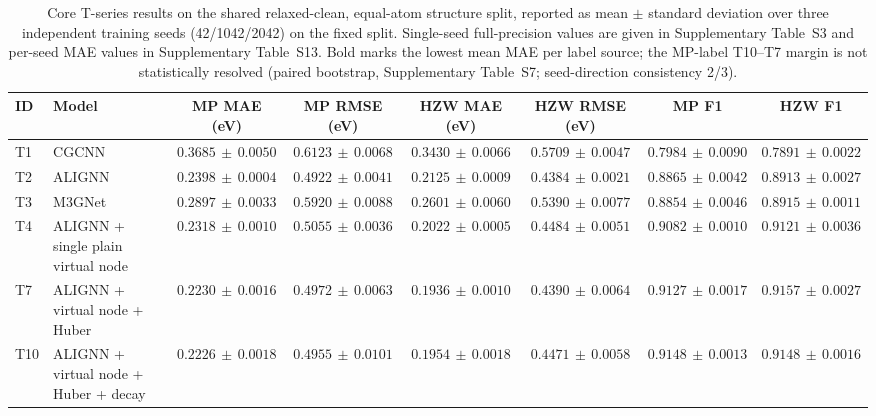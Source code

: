 \documentclass[a4paper,11pt]{article}
\begin{document}
\begin{table}[H]
\centering
\caption{Core T-series results on the shared relaxed-clean, equal-atom structure split, reported as mean \(\pm\) standard deviation over three independent training seeds (42/1042/2042) on the fixed split. Single-seed full-precision values are given in Supplementary Table~S3 and per-seed MAE values in Supplementary Table~S13. Bold marks the lowest mean MAE per label source; the MP-label T10--T7 margin is not statistically resolved (paired bootstrap, Supplementary Table~S7; seed-direction consistency 2/3).}
\label{tab:main-results}
\scriptsize
\setlength{\tabcolsep}{3.5pt}
\begin{tabularx}{\textwidth}{l Y c c c c c c}
\toprule
ID & Model & MP MAE (eV) & MP RMSE (eV) & HZW MAE (eV) & HZW RMSE (eV) & MP F1 & HZW F1 \\
\midrule
T1 & CGCNN & \(0.3685\,{\pm}\,0.0050\) & \(0.6123\,{\pm}\,0.0068\) & \(0.3430\,{\pm}\,0.0066\) & \(0.5709\,{\pm}\,0.0047\) & \(0.7984\,{\pm}\,0.0090\) & \(0.7891\,{\pm}\,0.0022\) \\
T2 & ALIGNN & \(0.2398\,{\pm}\,0.0004\) & \(0.4922\,{\pm}\,0.0041\) & \(0.2125\,{\pm}\,0.0009\) & \(0.4384\,{\pm}\,0.0021\) & \(0.8865\,{\pm}\,0.0042\) & \(0.8913\,{\pm}\,0.0027\) \\
T3 & M3GNet & \(0.2897\,{\pm}\,0.0033\) & \(0.5920\,{\pm}\,0.0088\) & \(0.2601\,{\pm}\,0.0060\) & \(0.5390\,{\pm}\,0.0077\) & \(0.8854\,{\pm}\,0.0046\) & \(0.8915\,{\pm}\,0.0011\) \\
T4 & ALIGNN + single plain virtual node & \(0.2318\,{\pm}\,0.0010\) & \(0.5055\,{\pm}\,0.0036\) & \(0.2022\,{\pm}\,0.0005\) & \(0.4484\,{\pm}\,0.0051\) & \(0.9082\,{\pm}\,0.0010\) & \(0.9121\,{\pm}\,0.0036\) \\
T7 & ALIGNN + virtual node + Huber & \(0.2230\,{\pm}\,0.0016\) & \(0.4972\,{\pm}\,0.0063\) & \(\bm{0.1936\,{\pm}\,0.0010}\) & \(0.4390\,{\pm}\,0.0064\) & \(0.9127\,{\pm}\,0.0017\) & \(0.9157\,{\pm}\,0.0027\) \\
T10 & ALIGNN + virtual node + Huber + decay & \(\bm{0.2226\,{\pm}\,0.0018}\) & \(0.4955\,{\pm}\,0.0101\) & \(0.1954\,{\pm}\,0.0018\) & \(0.4471\,{\pm}\,0.0058\) & \(0.9148\,{\pm}\,0.0013\) & \(0.9148\,{\pm}\,0.0016\) \\
\bottomrule
\end{tabularx}
\end{table}
\end{document}
